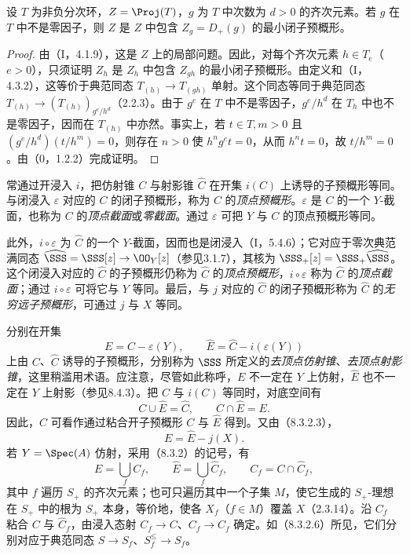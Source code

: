 设 $T$ 为非负分次环，$Z=\Proj(T)$，$g$ 为 $T$ 中次数为 $d>0$ 的齐次元素。若 $g$ 在 $T$ 中不是零因子，则 $Z$ 是 $Z$ 中包含 $Z_g=D_+(g)$ 的最小闭子预概形。
\begin{proof}
由（I，4.1.9），这是 $Z$ 上的局部问题。因此，对每个齐次元素 $h\in T_e$（$e>0$），只须证明 $Z_h$ 是 $Z_h$ 中包含 $Z_{gh}$ 的最小闭子预概形。由定义和（I，4.3.2），这等价于典范同态 $T_{(h)}\to T_{(gh)}$ 单射。这个同态等同于典范同态 $T_{(h)}\to(T_{(h)})_{g^e/h^d}$（2.2.3）。由于 $g^e$ 在 $T$ 中不是零因子，$g^e/h^d$ 在 $T_h$ 中也不是零因子，因而在 $T_{(h)}$ 中亦然。事实上，若 $t\in T,m>0$ 且 $(g^e/h^d)(t/h^m)=0$，则存在 $n>0$ 使 $h^ng^et=0$，从而 $h^nt=0$，故 $t/h^m=0$。由（0，1.2.2）完成证明。
\end{proof}

常通过开浸入 $i$，把仿射锥 $C$ 与射影锥 $\widehat C$ 在开集 $i(C)$ 上诱导的子预概形等同。与闭浸入 $\varepsilon$ 对应的 $C$ 的闭子预概形，称为 $C$ 的\emph{顶点预概形}。$\varepsilon$ 是 $C$ 的一个 $Y$-截面，也称为 $C$ 的\emph{顶点截面}或\emph{零截面}。通过 $\varepsilon$ 可把 $Y$ 与 $C$ 的顶点预概形等同。

此外，$i\circ\varepsilon$ 为 $\widehat C$ 的一个 $Y$-截面，因而也是闭浸入（I，5.4.6）；它对应于零次典范满同态 $\widehat{\SSS}=\SSS[z]\to\OO_Y[z]$（参见3.1.7），其核为 $\SSS_+[z]=\SSS_+\widehat{\SSS}$。这个闭浸入对应的 $\widehat C$ 的子预概形仍称为 $\widehat C$ 的\emph{顶点预概形}，$i\circ\varepsilon$ 称为 $\widehat C$ 的\emph{顶点截面}；通过 $i\circ\varepsilon$ 可将它与 $Y$ 等同。最后，与 $j$ 对应的 $\widehat C$ 的闭子预概形称为 $\widehat C$ 的\emph{无穷远子预概形}，可通过 $j$ 与 $X$ 等同。

分别在开集
\begin{equation}
E=C-\varepsilon(Y),\qquad \widehat E=\widehat C-i(\varepsilon(Y))
\tag{8.3.4.1}
\end{equation}
上由 $C$、$\widehat C$ 诱导的子预概形，分别称为 $\SSS$ 所定义的\emph{去顶点仿射锥}、\emph{去顶点射影锥}，这里稍滥用术语。应注意，尽管如此称呼，$E$ 不一定在 $Y$ 上仿射，$\widehat E$ 也不一定在 $Y$ 上射影（参见8.4.3）。把 $C$ 与 $i(C)$ 等同时，对底空间有
\begin{equation}
C\cup\widehat E=\widehat C,\qquad C\cap\widehat E=E.
\tag{8.3.4.2}
\end{equation}
因此，$\widehat C$ 可看作通过粘合开子预概形 $C$ 与 $\widehat E$ 得到。又由（8.3.2.3），
\begin{equation}
E=\widehat E-j(X).
\tag{8.3.4.3}
\end{equation}
若 $Y=\Spec(A)$ 仿射，采用（8.3.2）的记号，有
\begin{equation}
E=\bigcup_f C_f,\qquad \widehat E=\bigcup_f\widehat C_f,
\qquad C_f=C\cap\widehat C_f,
\tag{8.3.4.4}
\end{equation}
其中 $f$ 遍历 $S_+$ 的齐次元素；也可只遍历其中一个子集 $M$，使它生成的 $S_+$-理想在 $S_+$ 中的根为 $S_+$ 本身，等价地，使各 $X_f$（$f\in M$）覆盖 $X$（2.3.14）。沿 $C_f$ 粘合 $C$ 与 $\widehat C_f$，由浸入态射 $C_f\to C$、$C_f\to\widehat C_f$ 确定。如（8.3.2.6）所见，它们分别对应于典范同态 $S\to S_f$、$S_f^{\leq}\to S_f$。

